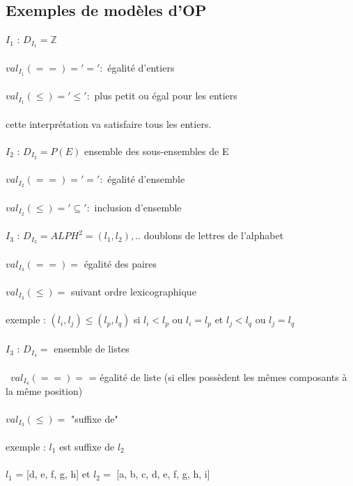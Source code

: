 \subsection{Exemples de modèles d'OP}
\underline{$I_{1}$} : $D_{I_{1}} =  \mathbb{Z}$ \\ \\
$ val_{I_{1}}(==) = '=' :$ égalité d'entiers \\ \\
$ val_{I_{1}}(\leq) = '\leq' :$ plus petit ou égal pour les entiers\\ \\
cette interprétation va satisfaire tous les entiers.\\ \\
\underline{$I_{2}$} : $D_{I_{2}} =  P(E)$ ensemble des sous-ensembles de E\\ \\
$ val_{I_{2}}(==) = '=' :$ égalité d'ensemble \\ \\
$ val_{I_{2}}(\leq) = '\subseteq' :$ inclusion d'ensemble\\ \\
\underline{$I_{3}$} : $D_{I_{3}} = ALPH^{2} = {(l_{1},l_{2}),..}$ doublons de lettres de l'alphabet\\ \\
$ val_{I_{3}}(==) = $ égalité des paires \\ \\
$ val_{I_{3}}(\leq) =$ suivant ordre lexicographique\\ \\
exemple : $(l_{i},l_{j}) \leq (l_{p},l_{q})$ si $ l_{i} < l_{p}$ ou $ l_{i} = l_{p}$ et $ l_{j} < l_{q}$ ou $ l_{j} = l_{q}$\\ \\ 
\underline{$I_{3}$} : $D_{I_{4}} =$ ensemble de listes\\ \\\
$ val_{I_{4}}(==) = $ = égalité de liste (si elles possèdent les mêmes composants à la même position)\\ \\
$ val_{I_{3}}(\leq) =$ "suffixe de" \\ \\
exemple : $l_{1} $ est suffixe de $l_{2}$ \\ \\
$l_{1} $ = [d, e, f, g, h] et $l_{2} =$ [a, b, c, d, e, f, g, h, i]